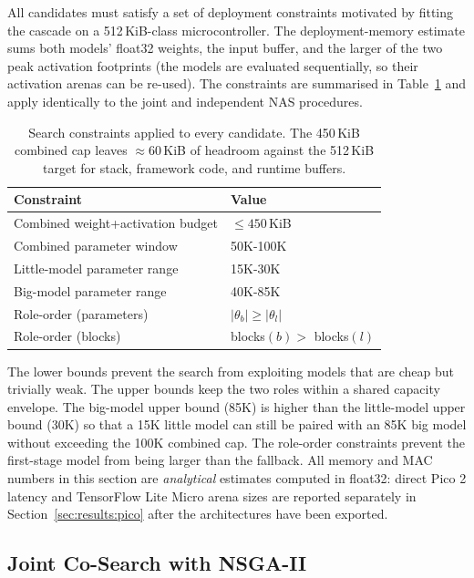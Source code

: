 \documentclass[conference]{IEEEtran}
\begin{document}
All candidates must satisfy a set of deployment constraints motivated by
fitting the cascade on a 512\,KiB-class microcontroller. The
deployment-memory estimate sums both models' float32 weights, the input
buffer, and the larger of the two peak activation footprints (the models are
evaluated sequentially, so their activation arenas can be re-used). The
constraints are summarised in Table~\ref{tab:search-constraints} and apply
identically to the joint and independent NAS procedures.

\begin{table}[t]
\centering
\caption{Search constraints applied to every candidate. The 450\,KiB
combined cap leaves $\approx$60\,KiB of headroom against the 512\,KiB target
for stack, framework code, and runtime buffers.}
\label{tab:search-constraints}
\footnotesize
\begin{tabular}{@{}ll@{}}
\toprule
\textbf{Constraint} & \textbf{Value} \\
\midrule
Combined weight+activation budget   & $\leq 450$\,KiB \\
Combined parameter window           & 50K-100K \\
Little-model parameter range        & 15K-30K \\
Big-model parameter range           & 40K-85K \\
Role-order (parameters)             & $|\theta_b| \geq |\theta_l|$ \\
Role-order (blocks)                 & blocks$(b)>$ blocks$(l)$ \\
\bottomrule
\end{tabular}
\end{table}

The lower bounds prevent the search from exploiting models that are cheap
but trivially weak. The upper bounds keep the two roles within a shared
capacity envelope. The big-model upper bound (85K) is higher than the
little-model upper bound (30K) so that a 15K little model can still be
paired with an 85K big model without exceeding the 100K combined cap. The
role-order constraints prevent the first-stage model from being larger than
the fallback. All memory and MAC numbers in this section are
\emph{analytical} estimates computed in float32: direct Pico 2 latency and
TensorFlow Lite Micro \cite{david2021tflm} arena sizes are reported
separately in Section~\ref{sec:results:pico} after the architectures have
been exported.

\subsection{Joint Co-Search with NSGA-II}
\label{sec:methodology:joint}
\end{document}
